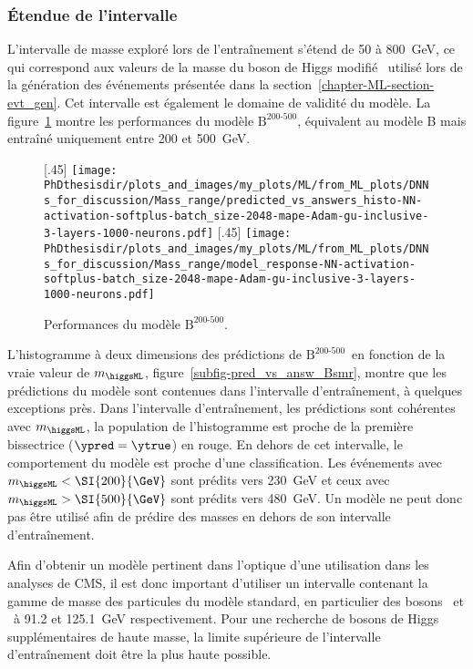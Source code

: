 \subsubsection{Étendue de l'intervalle}
\def\Bsmr{$\text{B}^\text{200-500}$}
L'intervalle de masse exploré lors de l'entraînement s'étend de \num{50} à \SI{800}{\GeV},
ce qui correspond aux valeurs de la masse du boson de Higgs modifié \higgsML\ utilisé lors de la génération des événements
présentée dans la section~\ref{chapter-ML-section-evt_gen}.
Cet intervalle est également le domaine de validité du modèle.
La figure~\ref{fig-Bsmr}
montre les performances du modèle \Bsmr,
équivalent au modèle B mais entraîné uniquement entre \num{200} et \SI{500}{\GeV}.
\begin{figure}[h]
\centering

[.45\textwidth]
{\texttt{[image: \\PhDthesisdir/plots\_and\_images/my\_plots/ML/from\_ML\_plots/DNNs\_for\_discussion/Mass\_range/predicted\_vs\_answers\_histo-NN-activation-softplus-batch\_size-2048-mape-Adam-gu-inclusive-3-layers-1000-neurons.pdf]}\vspace{-.5\baselineskip}}
\hfill
{}[.45\textwidth]
{\texttt{[image: \\PhDthesisdir/plots\_and\_images/my\_plots/ML/from\_ML\_plots/DNNs\_for\_discussion/Mass\_range/model\_response-NN-activation-softplus-batch\_size-2048-mape-Adam-gu-inclusive-3-layers-1000-neurons.pdf]}\vspace{-.5\baselineskip}}

\caption{Performances du modèle \Bsmr.}
\label{fig-Bsmr}
\end{figure}
\par
L'histogramme à deux dimensions des prédictions de \Bsmr\ en fonction de la vraie valeur de $m_{\higgsML}$,
figure~\ref{subfig-pred_vs_answ_Bsmr},
montre que les prédictions du modèle sont contenues dans l'intervalle d'entraînement,
à quelques exceptions près.
Dans l'intervalle d'entraînement, les prédictions sont cohérentes avec $m_{\higgsML}$,
la population de l'histogramme est proche de la première bissectrice ($\ypred=\ytrue$) en rouge.
En dehors de cet intervalle,
le comportement du modèle est proche d'une classification.
Les événements
avec $m_{\higgsML}<\SI{200}{\GeV}$ sont prédits vers \SI{230}{\GeV}
et ceux 
avec $m_{\higgsML}>\SI{500}{\GeV}$ sont prédits vers \SI{480}{\GeV}.
Un modèle ne peut donc pas être utilisé afin de prédire des masses en dehors de son intervalle d'entraînement.
\par
Afin d'obtenir un modèle pertinent dans l'optique d'une utilisation dans les analyses de CMS,
il est donc important d'utiliser un intervalle
contenant la gamme de masse des particules du modèle standard,
en particulier des bosons \Zboson\ et \higgs\ à \num{91.2} et \SI{125.1}{\GeV} respectivement.
Pour une recherche de bosons de Higgs supplémentaires de haute masse,
la limite supérieure de l'intervalle d'entraînement doit être la plus haute possible.
